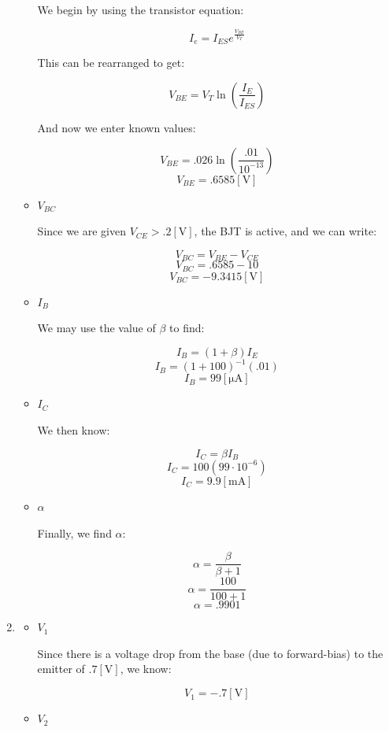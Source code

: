 \begin{enumerate}
\begin{itemize}
        We begin by using the transistor equation:

        $$I_e=I_{ES}e^{\frac{V_{BE}}{V_T}}$$

        This can be rearranged to get:

        $$V_{BE}=V_T\ln\left( \frac{I_E}{I_{ES}} \right)$$

        And now we enter known values:

        $$V_{BE}=.026\ln\left( \frac{.01}{10^{-13}} \right)$$
        $$\boxed{V_{BE}=.6585[\si{\volt}]}$$

      \item $V_{BC}$

        Since we are given $V_{CE}>.2[\si{\volt}]$, the BJT is active, and we can write:

        $$V_{BC}=V_{BE}-V_{CE}$$
        $$V_{BC}=.6585-10$$
        $$\boxed{V_{BC}=-9.3415[\si{\volt}]}$$

      \item $I_{B}$

        We may use the value of $\beta$ to find:

        $$I_B=(1+\beta)I_E$$
        $$I_B=(1+100)^{-1}(.01)$$
        $$\boxed{I_B=99[\si{\micro\ampere}]}$$

      \item $I_{C}$

        We then know:

        $$I_C=\beta I_B$$
        $$I_C=100(99\cdot10^{-6})$$
        $$\boxed{I_C=9.9[\si{\milli\ampere}]}$$

      \item $\alpha$

        Finally, we find $\alpha$:

        $$\alpha=\frac{\beta}{\beta+1}$$
        $$\alpha=\frac{100}{100+1}$$
        $$\boxed{\alpha=.9901}$$

    \end{itemize}

  \item

    \begin{itemize}

      \item $V_1$

        Since there is a voltage drop from the base (due to forward-bias) to the emitter of $.7[\si{\volt}]$, we know:

        $$\boxed{V_1=-.7[\si{\volt}]}$$

      \item $V_2$


\end{itemize}
\end{enumerate}
